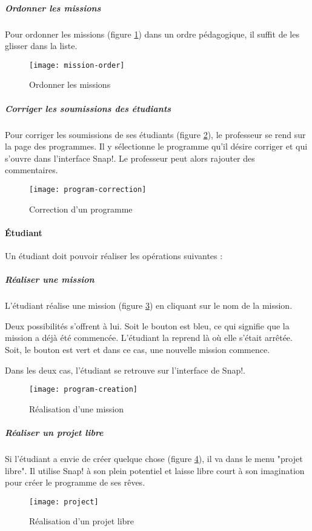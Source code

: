 \subparagraph{Ordonner les missions} Pour ordonner les missions (figure \ref{fig:mission-order}) dans un ordre pédagogique, il suffit de les glisser dans la liste.
\begin{figure}
  \begin{center}
    \texttt{[image: mission-order]}
    \caption{Ordonner les missions}
    \label{fig:mission-order}
  \end{center}
\end{figure}

\subparagraph{Corriger les soumissions des étudiants} Pour corriger les soumissions de ses étudiants (figure \ref{fig:program-correction}), le professeur se rend sur la page des programmes. Il y sélectionne le programme qu'il désire corriger et qui s'ouvre dans l'interface Snap!. Le professeur peut alors rajouter des commentaires.
\begin{figure}
  \begin{center}
    \texttt{[image: program-correction]}
    \caption{Correction d'un programme}
    \label{fig:program-correction}
  \end{center}
\end{figure}

\paragraph{Étudiant}
Un étudiant doit pouvoir réaliser les opérations suivantes :
\subparagraph{Réaliser une mission} L'étudiant réalise une mission (figure \ref{fig:program-creation}) en cliquant sur le nom de la mission.

Deux possibilités s'offrent à lui. Soit le bouton est bleu, ce qui signifie que la mission a déjà été commencée. L'étudiant la reprend là où elle s'était arrêtée. Soit, le bouton est vert et dans ce cas, une nouvelle mission commence.

Dans les deux cas, l'étudiant se retrouve sur l'interface de Snap!.
\begin{figure}
  \begin{center}
    \texttt{[image: program-creation]}
    \caption{Réalisation d'une mission}
    \label{fig:program-creation}
  \end{center}
\end{figure}

\subparagraph{Réaliser un projet libre} Si l'étudiant a envie de créer quelque chose (figure \ref{fig:project}), il va dans le menu "projet libre". Il utilise Snap! à son plein potentiel et laisse libre court à son imagination pour créer le programme de ses rêves.
\begin{figure}
  \begin{center}
    \texttt{[image: project]}
    \caption{Réalisation d'un projet libre}
    \label{fig:project}
  \end{center}
\end{figure}
